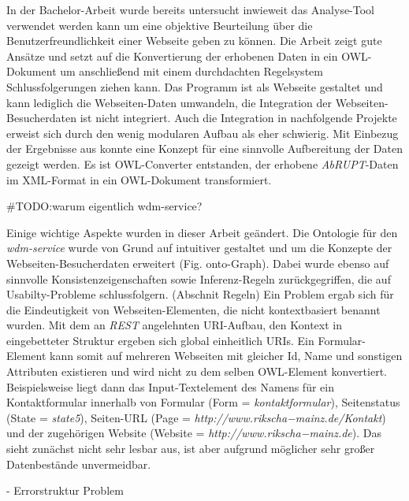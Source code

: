 \documentclass[runningheads,a4paper]{llncs}
\begin{document}
In der Bachelor-Arbeit \cite{Brieger} wurde bereits untersucht inwieweit das Analyse-Tool \cite{url_abrupt} verwendet werden kann um eine objektive Beurteilung über die Benutzerfreundlichkeit einer Webseite geben zu können. 
Die Arbeit zeigt gute Ansätze und setzt auf die Konvertierung der erhobenen Daten in ein OWL-Dokument um anschließend mit einem durchdachten Regelsystem Schlussfolgerungen ziehen kann. 
Das Programm ist als Webseite gestaltet und kann lediglich die Webseiten-Daten umwandeln, die Integration der Webseiten-Besucherdaten ist nicht integriert. 
Auch die Integration in nachfolgende Projekte erweist sich durch den wenig modularen Aufbau als eher schwierig. 
Mit Einbezug der Ergebnisse aus \cite{Martin} konnte eine Konzept für eine sinnvolle Aufbereitung der Daten gezeigt werden. 
Es ist OWL-Converter entstanden, der erhobene \textit{AbRUPT}-Daten im XML-Format in ein OWL-Dokument transformiert.

\#TODO:warum eigentlich wdm-service?

Einige wichtige Aspekte wurden in dieser Arbeit geändert. 
Die Ontologie für den \textit{wdm-service} wurde von Grund auf intuitiver gestaltet und um die Konzepte der Webseiten-Besucherdaten erweitert (Fig. onto-Graph). 
Dabei wurde ebenso auf sinnvolle Konsistenzeigenschaften sowie Inferenz-Regeln zurückgegriffen, die auf Usabilty-Probleme schlussfolgern. (Abschnit Regeln)
Ein Problem ergab sich für die Eindeutigkeit von Webseiten-Elementen, die nicht kontextbasiert benannt wurden. 
Mit dem an \textit{REST} angelehnten URI-Aufbau, den Kontext in eingebetteter Struktur ergeben sich global einheitlich URIs. 
Ein Formular-Element kann somit auf mehreren Webseiten mit gleicher Id, Name und sonstigen Attributen existieren und wird nicht zu dem selben OWL-Element konvertiert. 
Beispielsweise liegt dann das Input-Textelement des Namens für ein Kontaktformular innerhalb von Formular (Form = \textit{kontaktformular}), Seitenstatus (State = \textit{state5}), Seiten-URL (Page = \textit{http://www.rikscha−mainz.de/Kontakt}) und der zugehörigen Website (Website = \textit{http://www.rikscha−mainz.de}).
Das sieht zunächst nicht sehr lesbar aus, ist aber aufgrund möglicher sehr großer Datenbestände unvermeidbar. 

 
- Errorstruktur
Problem
\end{document}
